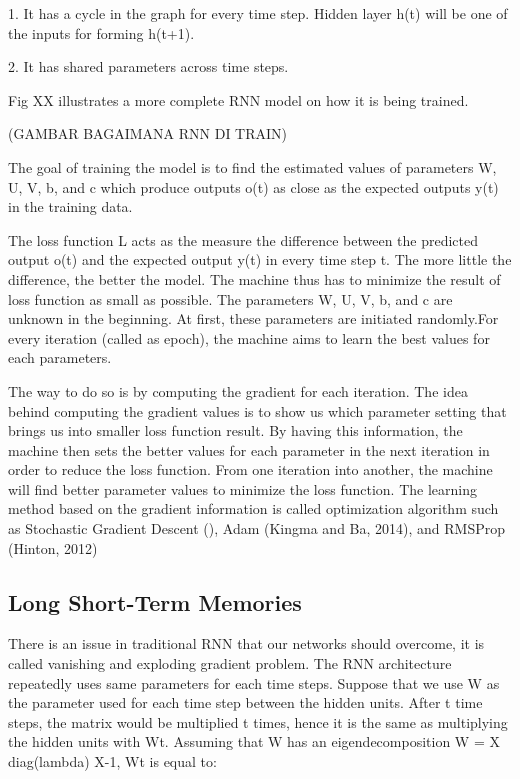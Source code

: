 1. It has a cycle in the graph for every time step. Hidden layer h(t) will be one of the inputs for forming h(t+1).

2. It has shared parameters across time steps. 

Fig XX illustrates a more complete RNN model on how it is being trained.

(GAMBAR BAGAIMANA RNN DI TRAIN)

The goal of training the model is to find the estimated values of parameters W, U, V, b, and c which produce outputs o(t) as close as the expected outputs y(t) in the training data. 

The loss function L acts as the measure the difference between the predicted output o(t) and the expected output y(t) in every time step t. The more little the difference, the better the model. The machine thus has to minimize the result of loss function as small as possible. The parameters W, U, V, b, and c are unknown in the beginning. At first, these parameters are initiated randomly.For every iteration (called as epoch), the machine aims to learn the best values for each parameters.

The way to do so is by computing the gradient for each iteration. The idea behind computing the gradient values is to show us which parameter setting that brings us into smaller loss function result. By having this information, the machine then sets the better values for each parameter in the next iteration in order to reduce the loss function. From one iteration into another, the machine will find better parameter values to minimize the loss function. The learning method based on the gradient information is called optimization algorithm such as Stochastic Gradient Descent (), Adam (Kingma and Ba, 2014), and RMSProp (Hinton, 2012)

\subsection{Long Short-Term Memories}
There is an issue in traditional RNN that our networks should overcome, it is called vanishing and exploding gradient problem. The RNN architecture repeatedly uses same parameters for each time steps. Suppose that we use W as the parameter used for each time step between the hidden units. After t time steps, the matrix would be multiplied t times, hence it is the same as multiplying the hidden units with Wt. Assuming that W has an eigendecomposition W = X diag(lambda) X-1, Wt is equal to:

